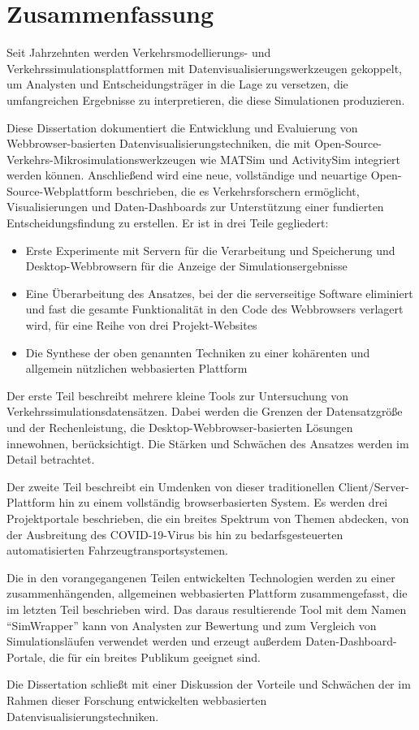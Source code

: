\chapter*{Zusammenfassung}

Seit Jahrzehnten werden Verkehrsmodellierungs- und Verkehrssimulationsplattformen mit Datenvisualisierungswerkzeugen gekoppelt, um Analysten und Entscheidungsträger in die Lage zu versetzen, die umfangreichen Ergebnisse zu interpretieren, die diese Simulationen produzieren.

Diese Dissertation dokumentiert die Entwicklung und Evaluierung von Webbrowser-basierten Datenvisualisierungstechniken, die mit Open-Source-Verkehrs-Mikrosimulationswerkzeugen wie MATSim und ActivitySim integriert werden können. Anschließend wird eine neue, vollständige und neuartige Open-Source-Webplattform beschrieben, die es Verkehrsforschern ermöglicht, Visualisierungen und Daten-Dashboards zur Unterstützung einer fundierten Entscheidungsfindung zu erstellen. Er ist in drei Teile gegliedert:

\begin{itemize}
  \item Erste Experimente mit Servern für die Verarbeitung und Speicherung und Desktop-Webbrowsern für die Anzeige der Simulationsergebnisse
  \item Eine Überarbeitung des Ansatzes, bei der die serverseitige Software eliminiert und fast die gesamte Funktionalität in den Code des Webbrowsers verlagert wird, für eine Reihe von drei Projekt-Websites
  \item Die Synthese der oben genannten Techniken zu einer kohärenten und allgemein nützlichen webbasierten Plattform
\end{itemize}

Der erste Teil beschreibt mehrere kleine Tools zur Untersuchung von Verkehrssimulationsdatensätzen. Dabei werden die Grenzen der Datensatzgröße und der Rechenleistung, die Desktop-Webbrowser-basierten Lösungen innewohnen, berücksichtigt. Die Stärken und Schwächen des Ansatzes werden im Detail betrachtet.

Der zweite Teil beschreibt ein Umdenken von dieser traditionellen Client/Server-Plattform hin zu einem vollständig browserbasierten System. Es werden drei Projektportale beschrieben, die ein breites Spektrum von Themen abdecken, von der Ausbreitung des COVID-19-Virus bis hin zu bedarfsgesteuerten automatisierten Fahrzeugtransportsystemen.

Die in den vorangegangenen Teilen entwickelten Technologien werden zu einer zusammenhängenden, allgemeinen webbasierten Plattform zusammengefasst, die im letzten Teil beschrieben wird. Das daraus resultierende Tool mit dem Namen ``SimWrapper'' kann von Analysten zur Bewertung und zum Vergleich von Simulationsläufen verwendet werden und erzeugt außerdem Daten-Dashboard-Portale, die für ein breites Publikum geeignet sind.

Die Dissertation schließt mit einer Diskussion der Vorteile und Schwächen der im Rahmen dieser Forschung entwickelten webbasierten Datenvisualisierungstechniken.
